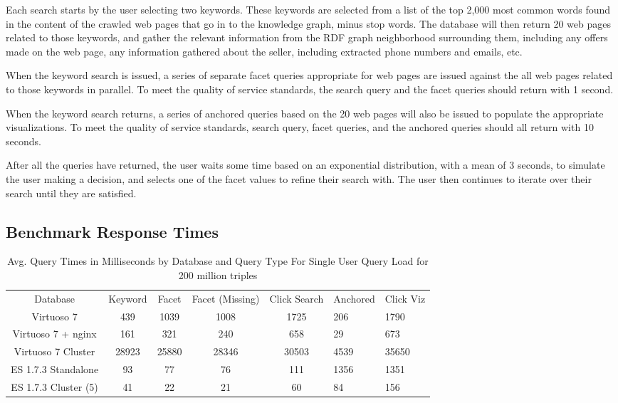 Each search starts by the user selecting two keywords.  
These keywords are selected from a list of the top 2,000 most common words found in the content of the crawled web pages that go in to the knowledge graph, minus stop words. 
The database will then return 20 web pages related to those keywords, and gather the relevant information from the RDF graph neighborhood surrounding them, including any offers made on the web page, any information gathered about the seller, including extracted phone numbers and emails, etc.  

When the keyword search is issued, a series of separate facet queries appropriate for web pages are issued against the all web pages related to those keywords in parallel.
To meet the quality of service standards, the search query and the facet queries should return with 1 second.

When the keyword search returns, a series of anchored queries based on the 20 web pages will also be issued to populate the appropriate visualizations. 
To meet the quality of service standards, search query, facet queries, and the anchored queries should all return with 10 seconds.  

After all the queries have returned, the user waits some time based on an exponential distribution, with a mean of 3 seconds, to simulate the user making a decision, and selects one of the facet values to refine their search with.
The user then continues to iterate over their search until they are satisfied.  




\subsection{Benchmark Response Times}

 \begin{table} 
    \begin{tabular}{ c c c c c }
        Database & Keyword & Facet & Facet (Missing) & Click Search & Anchored & Click Viz \\ 
        Virtuoso 7 & 439 & 1039 & 1008 & 1725 & 206 &  1790 \\ 
        Virtuoso 7 + nginx & 161 & 321 & 240 & 658 & 29 &  673 \\ 
        Virtuoso 7 Cluster & 28923 & 25880 & 28346 & 30503 & 4539 & 35650\\
        ES 1.7.3 Standalone & 93 & 77 & 76 & 111 & 1356 & 1351 \\ 
        ES 1.7.3 Cluster (5) & 41 & 22 & 21 & 60 & 84 & 156 \\ 
    \end{tabular} 
    \caption{Avg. Query Times in Milliseconds by Database and Query Type For Single User Query Load for 200 million triples}
    \label{table:qt_single_user_200m}
\end{table}

